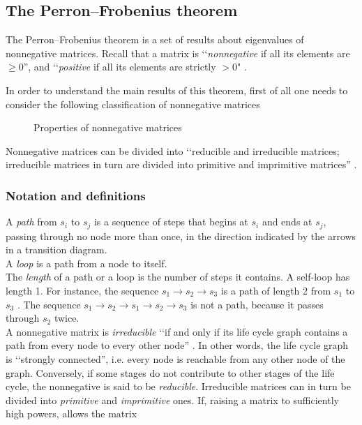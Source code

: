 \documentclass[\main/main.tex]{subfiles}
\begin{document}
\subsection{The Perron–Frobenius theorem}
The Perron–Frobenius theorem is a set of results about eigenvalues of nonnegative matrices. Recall that a matrix is \lq\lq \textit{nonnegative} if all its elements are $\geq 0$'', and \lq\lq \textit{positive} if all its elements are strictly $> 0$" \citep{Keyfitz2005}. 

In order to understand the main results of this theorem, first of all one needs to consider the following classification of nonnegative matrices \citep{Keyfitz2005} 


\begin{figure}[h!]
\caption{Properties of nonnegative matrices}
\end{figure}

Nonnegative matrices can be divided into \lq\lq reducible and irreducible matrices; irreducible matrices in turn are divided into primitive and imprimitive matrices'' \citep{Keyfitz2005}.

\subsubsection{Notation and definitions}

A \textit{path} from $s_i$ to $s_j$ is a sequence of steps that begins at $s_i$ and ends at $s_j$, passing through no node more than once, in the direction indicated by the arrows in a transition diagram.\\
A \textit{loop} is a path from a node to itself.\\
The \textit{length} of a path or a loop is the number of steps it contains. A self-loop has length 1. For instance, the sequence $s_1 \rightarrow s_2  \rightarrow s_3$ is a path of length 2 from $s_1$ to $s_3$ . The sequence $s_1 \rightarrow s_2 \rightarrow s_1 \rightarrow s_2  \rightarrow s_3$ is not a path, because it passes through $s_2 $ twice.\\
A nonnegative matrix is \textit{irreducible} \lq\lq if and only if its life cycle graph contains a path from every node to every other node'' \citep{Keyfitz2005}. In other words, the life cycle graph is \lq\lq strongly connected'', i.e. every node is reachable from any other node of the graph. Conversely, if some stages do not contribute to other stages of the life cycle, the nonnegative is said to be \textit{reducible}.
Irreducible matrices can in turn be divided into \textit{primitive} and \textit{imprimitive} ones. 
If, raising a matrix to sufficiently high powers, allows the matrix 
\end{document}

